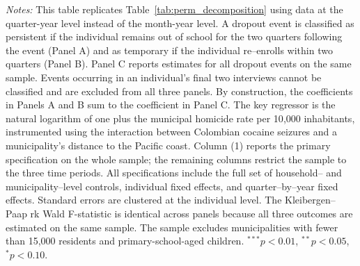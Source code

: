 \documentclass[12pt,letter,english,intoc,bibliography=totoc,index=totoc,BCOR10mm,captions=tableheading,nottitlepage,fleqn]{article}
\theoremstyle{break}
\begin{document}
\begin{table}[H]
\centering
\caption{Quarterly Dropout Decomposition Estimates}
\label{tab:perm_decomposition_quarterly}
\centering
\scriptsize

\begin{minipage}{0.95\linewidth}
    \scriptsize \singlespacing
    \textit{Notes:} This table replicates Table~\ref{tab:perm_decomposition} using data at the quarter-year level instead of the month-year level. A dropout event is classified as persistent if the individual remains out of school for the two quarters following the event (Panel A) and as temporary if the individual re--enrolls within two quarters (Panel B). Panel C reports estimates for all dropout events on the same sample. Events occurring in an individual's final two interviews cannot be classified and are excluded from all three panels. By construction, the coefficients in Panels A and B sum to the coefficient in Panel C. The key regressor is the natural logarithm of one plus the municipal homicide rate per 10{,}000 inhabitants, instrumented using the interaction between Colombian cocaine seizures and a municipality's distance to the Pacific coast. Column (1) reports the primary specification on the whole sample; the remaining columns restrict the sample to the three time periods. All specifications include the full set of household-- and municipality--level controls, individual fixed effects, and quarter--by--year fixed effects. Standard errors are clustered at the individual level. The Kleibergen--Paap rk Wald F-statistic is identical across panels because all three outcomes are estimated on the same sample. The sample excludes municipalities with fewer than 15{,}000 residents and primary-school-aged children. $^{***}p<0.01$, $^{**}p<0.05$, $^{*}p<0.10$.
    \end{minipage}
\end{table}
\end{document}

